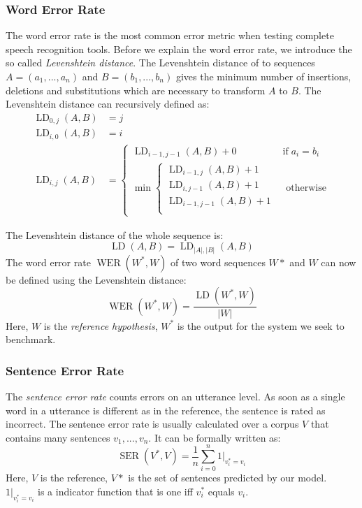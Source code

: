 \subsubsection{Word Error Rate}
The word error rate is the most common error metric when testing complete speech recognition tools. Before we explain the word error rate, we introduce the so called \textit{Levenshtein distance}. The Levenshtein distance of to sequences $A = (a_1,...,a_n)$ and $B=(b_1,...,b_n)$ gives the minimum number of insertions, deletions and substitutions which are necessary to transform $A$ to $B$. The Levenshtein distance can recursively defined as:
\begin{align*}
\operatorname{LD}_{0,j}(A, B) &= j \\
\operatorname{LD}_{i,0}(A, B) &= i \\
\operatorname{LD}_{i,j}(A, B) &= \begin{cases}
	\operatorname{LD}_{i-1,j-1}(A, B) + 0 & \text{if} \; a_i = b_i \\
	\min \begin{cases}
		\operatorname{LD}_{i-1,j}(A, B) + 1 \\
		\operatorname{LD}_{i,j-1}(A, B) + 1 \\
		\operatorname{LD}_{i-1,j-1}(A, B) + 1\\
	\end{cases} & \text{ otherwise}
\end{cases}
\end{align*}

The Levenshtein distance of the whole sequence is:
\[
\operatorname{LD}(A, B) = \operatorname{LD}_{|A|, |B|}(A, B)
\]
The word error rate $\operatorname{WER}(W^*, W)$ of two word sequences $W*$ and $W$ can now be defined using the Levenshtein distance: \\
\[
\operatorname{WER}(W^*, W) = \frac{\operatorname{LD}(W^*,W)}{|W|}
\]
Here, $W$ is the \textit{reference hypothesis}, $W^*$ is the output for the system we seek to benchmark.
\subsubsection{Sentence Error Rate}
The \textit{sentence error rate} counts errors on an utterance level. As soon as a single word in a utterance is different as in the reference, the sentence is rated as incorrect. The sentence error rate is usually calculated over a corpus $V$ that contains many sentences $v_1,...,v_n$. It can be formally written as:
\[
\operatorname{SER}(V^*, V) = \frac{1}{n} \sum_{i = 0}^n 1|_{v^*_i = v_i} 
\]
Here, $V$ is the reference, $V*$ is the set of sentences predicted by our model. $1|_{v^*_i = v_i}$ is a indicator function that is one iff $v^*_i$ equals $v_i$.
